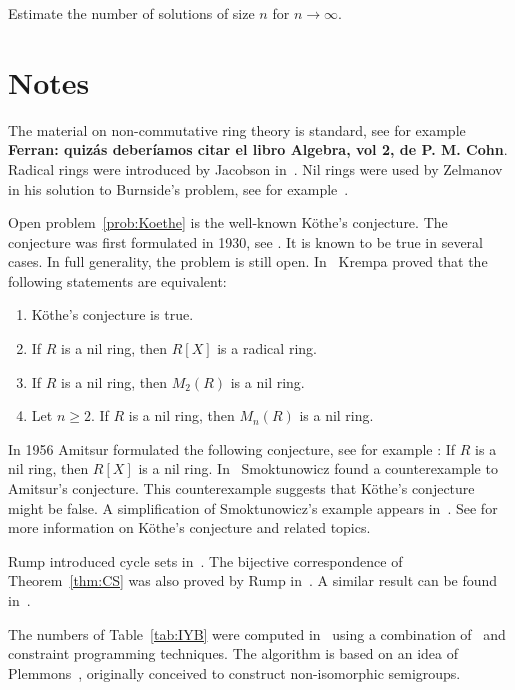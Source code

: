 \begin{problem}
	Estimate the number of solutions of size $n$ for $n\to\infty$. 
\end{problem}

\section*{Notes}

The material on non-commutative ring theory is standard, see for example~\cite{MR3308118} {\bf Ferran: quiz\'as deber\'{i}amos citar el libro Algebra, vol 2, de P. M. Cohn}.
Radical rings were introduced by Jacobson in~\cite{MR12271}. Nil rings were
used by Zelmanov in his solution to Burnside's problem, see for example~\cite{MR1199575}. 

Open problem~\ref{prob:Koethe} is the well-known K\"othe's conjecture. 
The conjecture was first formulated in 1930, see \cite{MR1545158}. It is known to be true
in several cases. In full generality, the problem is still open. In~\cite{MR306251} 
Krempa proved that
the following statements are equivalent:
\begin{enumerate}
	\item K\"othe's conjecture is true.  
	\item If $R$ is a nil ring, then $R[X]$ is a radical ring. 
	\item If $R$ is a nil ring, then $M_2(R)$ is a nil ring. 
	\item Let $n\geq2$. If $R$ is a nil ring, then $M_n(R)$ is a nil ring. 
\end{enumerate}

In 1956 Amitsur formulated the following conjecture, see for example
\cite{MR0347873}: If $R$ is a nil ring, then $R[X]$ is a nil ring. In~\cite{MR1793911} 
Smoktunowicz found a counterexample to Amitsur's conjecture. 
This counterexample suggests that K\"othe's conjecture might be false. 
A simplification of Smoktunowicz's example
appears in~\cite{MR3169522}. See \cite{MR1879880,MR2275597} for more
information on K\"othe's conjecture and related topics. 


Rump introduced cycle sets in~\cite{MR2132760}. The bijective correspondence of 
Theorem~\ref{thm:CS} was 
also proved by Rump in~\cite{MR2132760}. A similar result can be 
found in~\cite[Proposition 2.2]{MR1722951}. 

The numbers of Table~\ref{tab:IYB} were computed in~\cite{AMV}
using a combination of~\cite{GAP4} and constraint programming techniques. 
The algorithm is based on an idea of Plemmons~\cite{MR0258994}, originally 
conceived to construct non-isomorphic semigroups.  

